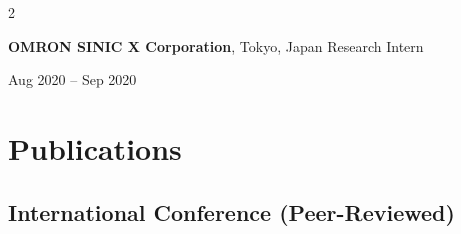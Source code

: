 \documentclass[10pt, letterpaper]{article}
\newenvironment{twocolentry}[2][]{
    \onecolentry
    \def\secondColumn{#2}
    \setcolumnwidth{\fill, 4.5 cm}
    \begin{paracol}{2}
}{
    \switchcolumn \raggedleft \secondColumn
    \end{paracol}
    \endonecolentry
}
\begin{document}
    \vspace{0.2 cm}
    
    \begin{twocolentry}{Aug 2020 -- Sep 2020}
        \textbf{OMRON SINIC X Corporation}, Tokyo, Japan \newline
        Research Intern
    \end{twocolentry}

    \section{Publications}
    
    \subsection{International Conference (Peer-Reviewed)}
    
\end{document}
